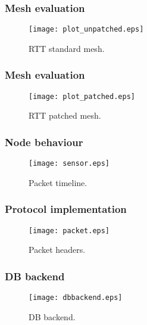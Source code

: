 \documentclass{beamer}
\begin{document}
\begin{frame}
\frametitle{Mesh evaluation}
	
	\begin{center}
		\begin{figure}
			\texttt{[image: plot\_unpatched.eps]}
			\caption{RTT standard mesh.}
		\end{figure}
	\end{center}
	
\end{frame}

\begin{frame}
\frametitle{Mesh evaluation}
	
	\begin{center}
		\begin{figure}
			\texttt{[image: plot\_patched.eps]}
			\caption{RTT patched mesh.}
		\end{figure}
	\end{center}
	
\end{frame}

\begin{frame}
\frametitle{Node behaviour}

	\begin{center}
		\begin{figure}
			\texttt{[image: sensor.eps]}
			\caption{Packet timeline.}
		\end{figure}
	\end{center}

\end{frame}

\begin{frame}
\frametitle{Protocol implementation}

	\begin{center}
		\begin{figure}
			\texttt{[image: packet.eps]}
			\caption{Packet headers.}
		\end{figure}
	\end{center}
	
\end{frame}

\begin{frame}
\frametitle{DB backend}

	\begin{center}
		\begin{figure}
			\texttt{[image: dbbackend.eps]}
			\caption{DB backend.}
		\end{figure}
	\end{center}

\end{frame}
\end{document}
